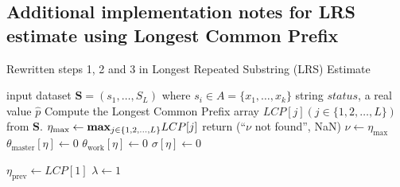﻿\documentclass[a3paper,xelatex,english]{bxjsarticle}
\newcommand\mib[1]{\boldsymbol{#1}}
\begin{document}

\clearpage
\subsection{Additional implementation notes for LRS estimate using Longest Common Prefix}
\begin{algorithm}
\caption{Rewritten steps 1, 2 and 3 in Longest Repeated Substring (LRS) Estimate}\label{alg:LRSMain}
\begin{algorithmic}[1]
\Require input dataset $\mib{S} = (s_{1}, \ldots, S_{L})$ where $s_{i} \in A = \{ x_{1}, \ldots, x_{k}\}$
                \Ensure string $status$, a real value $\hat{p}$
\State Compute the Longest Common Prefix array $LCP[j] (j \in \{ 1, 2, \ldots, L \})$ from $\mib{S}$.
\State $\displaystyle \eta_{\textrm{max}} \gets \textrm{\textbf{max}}_{j \in \{ 1, 2, \ldots, L \}} LCP[j]$
	\State return (``$\nu$ not found'', NaN)
	\Statex {}
\EndIf
\State $\nu \gets \eta_{\textrm{max}}$
\Statex {}
	\State $\theta_{\textrm{master}}[\eta] \gets 0$
	\State $\theta_{\textrm{work}}[\eta] \gets 0$
	\State $\sigma[\eta] \gets 0$
\EndFor

\State $\eta_{\textrm{prev}} \gets LCP[1]$
\State $\lambda \gets 1$


\end{algorithmic}
\end{algorithm}
\end{document}

